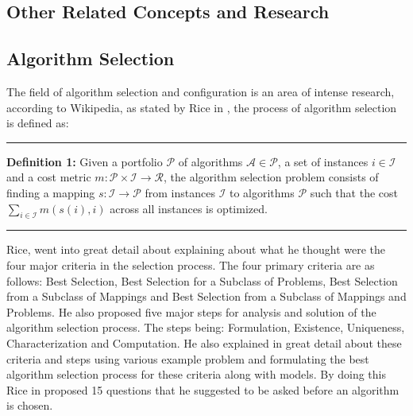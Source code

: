 \subsection{Other Related Concepts and Research}
\subsection*{Algorithm Selection}

The field of algorithm selection and configuration is an area of intense research, according to Wikipedia, as stated by Rice in \citep{rice197665}, the process of algorithm selection is defined as:

\par\noindent\rule{\textwidth}{0.4pt}\newline
\textbf{Definition 1:} Given a portfolio ${\displaystyle{\mathcal{P}}}$ of algorithms ${\displaystyle{\mathcal{A}} \in {\mathcal{P}}}$, a set of instances ${\displaystyle{i \in {\mathcal{I}}}}$ and a cost metric ${\displaystyle{m:{\mathcal{P}} \times {\mathcal{I}} \to \mathcal{R}}}$, the algorithm selection problem consists of finding a mapping ${\displaystyle s:{\mathcal {I}}\to {\mathcal {P}}}$ from instances ${\displaystyle {\mathcal {I}}}$ to algorithms ${\displaystyle {\mathcal {P}}}$ such that the cost ${\displaystyle \sum _{i\in {\mathcal {I}}}m(s(i),i)}$ across all instances is optimized.
\par\noindent\rule{\textwidth}{0.4pt}

Rice, went into great detail about explaining about what he thought were the four major criteria in the selection process. The four primary criteria are as follows: Best Selection, Best Selection for a Subclass of Problems, Best Selection from a Subclass of Mappings and Best Selection from a Subclass of Mappings and Problems. He also proposed five major steps for analysis and solution of the algorithm selection process. The steps being: Formulation, Existence, Uniqueness, Characterization and Computation. He also explained in great detail about these criteria and steps using various example problem and formulating the best algorithm selection process for these criteria along with models. By doing this Rice in \citep{rice197665} proposed 15 questions that he suggested to be asked before an algorithm is chosen.

